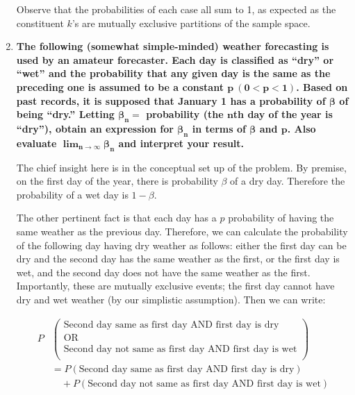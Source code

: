\documentclass[10pt, oneside]{article}   	%
\theoremstyle{definition}
\begin{document}
\begin{enumerate}[label=3.\arabic*]
Observe that the probabilities of each case all sum to 1, as expected as the constituent $k$'s are mutually exclusive partitions of the sample space.

\item  \begin{tcolorbox}[
  colback=Cerulean!5!white,
  colframe=Cerulean!75!black]
\textbf{The following (somewhat simple-minded) weather forecasting is used by an amateur forecaster. Each day is classified as ``dry'' or ``wet'' and the probability that any given day is the same as the preceding one is assumed to be a constant $\bm{p \ (0 < p < 1)}$. Based on past records, it is supposed that January 1 has a probability of $\bm{\beta}$ of being ``dry.'' Letting $\bm{\beta_n =}$ probability (the $\bm{n}$th day of the year is ``dry''), obtain an expression for $\bm{\beta_n}$ in terms of $\bm{\beta}$ and $\bm{p}$. Also evaluate $\bm{\lim_{n \rightarrow \infty} \beta_n}$ and interpret your result.}
\end{tcolorbox}

The chief insight here is in the conceptual set up of the problem. By premise, on the first day of the year, there is probability $\beta$ of a dry day. Therefore the probability of a wet day is $1 - \beta$. 

The other pertinent fact is that each day has a $p$ probability of having the same weather as the previous day. Therefore, we can calculate the probability of the following day having dry weather as follows: either the first day can be dry and the second day has the same weather as the first, or the first day is wet, and the second day does not have the same weather as the first. Importantly, these are mutually exclusive events; the first day cannot have dry and wet weather (by our simplistic assumption). Then we can write:

   \begin{align*}
   P &\begin{pmatrix} %
      \text{Second day same as first day AND first day is dry}  \\
      \text{OR}  \\
      \text{Second day not same as first day AND first day is wet} \\
   \end{pmatrix} \\
   &= P(\text{Second day same as first day AND first day is dry}) \\
   &\quad + P( \text{Second day not same as first day AND first day is wet})
   \end{align*}
   

\end{enumerate}
\end{document}
